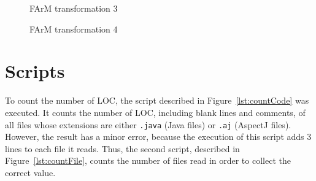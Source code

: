 \documentclass[11pt,twoside]{article}
\begin{document}
\begin{figure}[h!t!b!]
   \centering
   \caption{FArM transformation 3}
   \label{fig:step3}
\end{figure}

\begin{figure}[h!t!b!]
   \centering
   \caption{FArM transformation 4}
   \label{fig:step4}
\end{figure}


\section{Scripts}
\label{sec:app-scripts}
\lstset{ %
language=bash,                %
basicstyle=\footnotesize,       %
numbers=left,                   %
numberstyle=\footnotesize,      %
stepnumber=2,                   %
}

To count the number of LOC, the script described in Figure~\ref{lst:countCode} was executed. It counts the number of LOC, including blank lines and
comments, of all files whose extensions are either \texttt{.java} (Java files) or \texttt{.aj} (AspectJ files). However, the result has a minor error,
because the
execution of this script adds 3 lines to each file it reads. Thus, the second script, described in Figure~\ref{lst:countFile}, counts the number of
files read in order to collect the correct value. 
\end{document}

